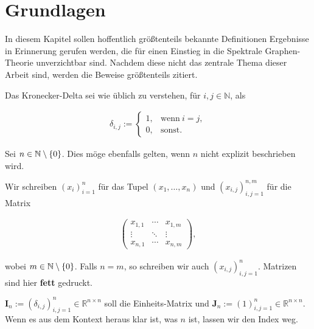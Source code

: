 \section{Grundlagen}

In diesem Kapitel sollen hoffentlich größtenteils bekannte Definitionen Ergebnisse in Erinnerung gerufen werden, die für einen Einstieg in die Spektrale Graphen-Theorie unverzichtbar sind.
Nachdem diese nicht das zentrale Thema dieser Arbeit sind, werden die Beweise größtenteils zitiert.

Das Kronecker-Delta sei wie üblich zu verstehen, für $i, j \in \mathbb N$, als

\begin{align*}
    \delta_{i, j}
    :=
    \begin{cases}
        1, & \text{wenn}~ i = j, \\
        0, & \text{sonst}.
    \end{cases}
\end{align*}

Sei $n \in \mathbb N \setminus {\left \{ 0 \right \}}$.
Dies möge ebenfalls gelten, wenn $n$ nicht explizit beschrieben wird.

Wir schreiben $(x_i)_{i=1}^n$ für das Tupel $(x_1, \dots, x_n)$ und $(x_{i, j})_{i, j = 1}^{n, m}$ für die Matrix

\begin{align*}
    \begin{pmatrix}
        x_{1, 1} & \cdots & x_{1, m} \\
        \vdots   & \ddots & \vdots   \\
        x_{n, 1} & \cdots & x_{n, m}
    \end{pmatrix},
\end{align*}

wobei $m \in \mathbb N \setminus {\left \{ 0 \right \}}$.
Falls $n = m$, so schreiben wir auch $(x_{i, j})_{i, j = 1}^n$.
Matrizen sind hier \textbf{fett} gedruckt.

$\mathbf I_n := (\delta_{i, j})_{i, j = 1}^n \in \mathbb R^{n \times n}$ soll die Einheits-Matrix und $\mathbf J_n := (1)_{i, j = 1}^n \in \mathbb R^{n \times n}$.
Wenn es aus dem Kontext heraus klar ist, was $n$ ist, lassen wir den Index weg.

